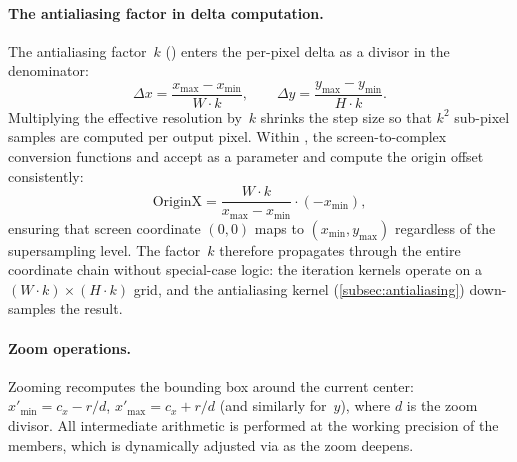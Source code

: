 \paragraph{The antialiasing factor in delta computation.}
\label{par:aa-delta}
The antialiasing factor~$k$ () enters the
per-pixel delta as a divisor in the denominator:
\[
  \Delta x = \frac{x_{\max} - x_{\min}}{W \cdot k}, \qquad
  \Delta y = \frac{y_{\max} - y_{\min}}{H \cdot k}.
\]
Multiplying the effective resolution by~$k$ shrinks the step size so
that $k^2$ sub-pixel samples are computed per output pixel.  Within
, the screen-to-complex conversion
functions  and 
accept  as a parameter and compute the origin
offset consistently:
\[
  \text{OriginX} = \frac{W \cdot k}{x_{\max} - x_{\min}}
                   \cdot (-x_{\min}),
\]
ensuring that screen coordinate $(0,0)$ maps to $(x_{\min}, y_{\max})$
regardless of the supersampling level.  The factor~$k$ therefore
propagates through the entire coordinate chain without special-case
logic: the iteration kernels operate on a
$(W\!\cdot\! k) \times (H\!\cdot\! k)$ grid, and the antialiasing
kernel (\cref{subsec:antialiasing}) down-samples the result.

\paragraph{Zoom operations.}
Zooming recomputes the bounding box around the current center:
$x'_{\min} = c_x - r/d$, $x'_{\max} = c_x + r/d$ (and similarly
for~$y$), where $d$ is the zoom divisor.  All intermediate arithmetic
is performed at the working precision of the 
members, which is dynamically adjusted via  as
the zoom deepens.

